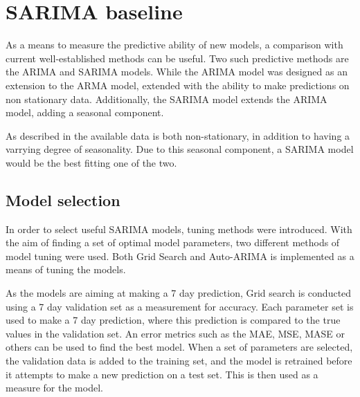 
\section{SARIMA baseline}
\label{section:Architecture:Baselines:Arima}

\iffalse
This section presents the overarching methods and method architectures used in this paper.
In an effort to analyse data and make predictions on the problem space, predictive models are applied.
Using well established methods, we intend on creating baseline predictions in order to evaluate a new model.
These baseline methods are presented here.
\fi


As a means to measure the predictive ability of new models, a comparison with current well-established methods can be useful.
Two such predictive methods are the ARIMA and SARIMA models.
While the ARIMA model was designed as an extension to the ARMA model, extended with the ability to make predictions on non stationary data.
Additionally, the SARIMA model extends the ARIMA model, adding a seasonal component.

As described in  the available data is both non-stationary, in addition to having a varrying degree of seasonality.
Due to this seasonal component, a SARIMA model would be the best fitting one of the two.


\subsection{Model selection}
In order to select useful SARIMA models, tuning methods were introduced.
With the aim of finding a set of optimal model parameters, two different methods of model tuning were used.
Both Grid Search and Auto-ARIMA is implemented as a means of tuning the models.%

As the models are aiming at making a 7 day prediction, Grid search is conducted using a 7 day validation set as a measurement for accuracy.
Each parameter set is used to make a 7 day prediction, where this prediction is compared to the true values in the validation set.
An error metrics such as the MAE, MSE, MASE or others can be used to find the best model.
When a set of parameters are selected, the validation data is added to the training set, and the model is retrained before it attempts to make a new prediction on a test set.
This is then used as a measure for the model.

